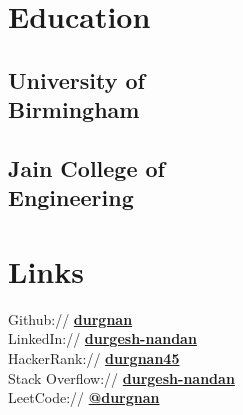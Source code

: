 \documentclass[]{deedy-resume-openfont}
\begin{document}
%
%

%
%

%
%

\begin{minipage}[t]{0.33\textwidth} 


\section{Education} 
\subsection{University of \\Birmingham}
\sectionsep

\subsection{Jain College of \\Engineering}
\sectionsep


\section{Links} 
Github:// \href{https://github.com/durgnan}{\bf durgnan} \\
LinkedIn://  \href{https://www.linkedin.com/in/durgesh-nandan-75a80b140}{\bf durgesh-nandan} \\
HackerRank://  \href{https://www.hackerrank.com/durgnan45}{\bf durgnan45} \\
Stack Overflow://  \href{https://stackoverflow.com/users/11324413/durgesh-nandan}{\bf durgesh-nandan} \\
LeetCode://  \href{https://leetcode.com/durgnan/}{\bf @durgnan}


\end{minipage}
\end{document}
